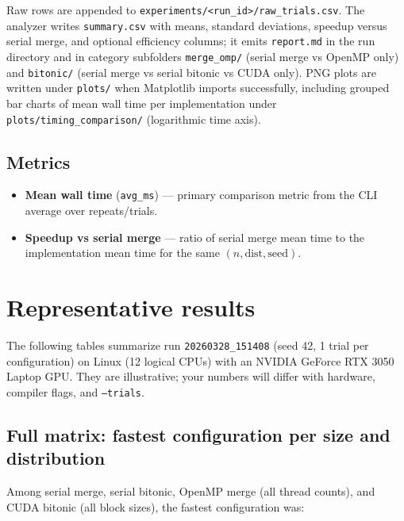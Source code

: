 \documentclass[11pt,a4paper]{article}
\begin{document}
Raw rows are appended to \texttt{experiments/<run\_id>/raw\_trials.csv}. The analyzer writes \texttt{summary.csv} with means, standard deviations, speedup versus serial merge, and optional efficiency columns; it emits \texttt{report.md} in the run directory and in category subfolders \texttt{merge\_omp/} (serial merge vs OpenMP only) and \texttt{bitonic/} (serial merge vs serial bitonic vs CUDA only). PNG plots are written under \texttt{plots/} when Matplotlib imports successfully, including grouped bar charts of mean wall time per implementation under \texttt{plots/timing\_comparison/} (logarithmic time axis).

\subsection{Metrics}
\begin{itemize}[noitemsep]
  \item \textbf{Mean wall time} (\texttt{avg\_ms}) — primary comparison metric from the CLI average over repeats/trials.
  \item \textbf{Speedup vs serial merge} — ratio of serial merge mean time to the implementation mean time for the same $(n, \text{dist}, \text{seed})$.
\end{itemize}

\section{Representative results}

The following tables summarize run \texttt{20260328\_151408} (seed 42, 1 trial per configuration) on Linux (12 logical CPUs) with an NVIDIA GeForce RTX 3050 Laptop GPU. They are illustrative; your numbers will differ with hardware, compiler flags, and \texttt{--trials}.

\subsection{Full matrix: fastest configuration per size and distribution}
Among serial merge, serial bitonic, OpenMP merge (all thread counts), and CUDA bitonic (all block sizes), the fastest configuration was:
\end{document}
